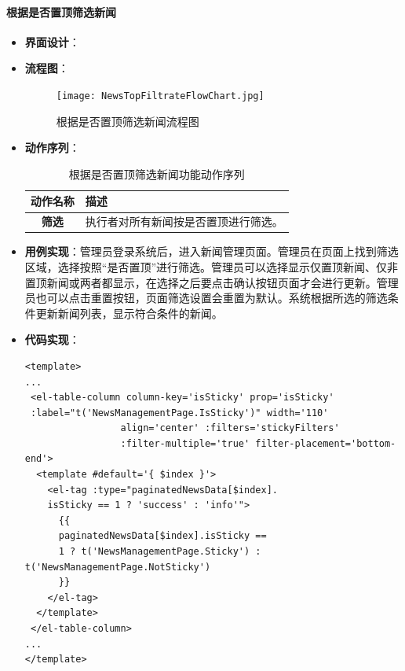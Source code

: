 \paragraph{根据是否置顶筛选新闻}
\begin{itemize}
	\item \textbf{界面设计}：
	\item \textbf{流程图}：
	\begin{figure}[H]
		\centering
		\texttt{[image: NewsTopFiltrateFlowChart.jpg]}
		\caption{根据是否置顶筛选新闻流程图}
		\label{1}
	\end{figure}
	\item \textbf{动作序列}：
	\begin{table}[H]
		\centering
		\caption{根据是否置顶筛选新闻功能动作序列}
		\renewcommand\arraystretch{1.5}
		\begin{tabular}{|c|>{\raggedright\arraybackslash}p{10cm}|}
			\hline
			\textbf{动作名称} & \textbf{描述} \\ \hline
			\textbf{筛选} & 执行者对所有新闻按是否置顶进行筛选。 \\ \hline
		\end{tabular}
	\end{table}
	\item \textbf{用例实现}：管理员登录系统后，进入新闻管理页面。管理员在页面上找到筛选区域，选择按照“是否置顶”进行筛选。管理员可以选择显示仅置顶新闻、仅非置顶新闻或两者都显示，在选择之后要点击确认按钮页面才会进行更新。管理员也可以点击重置按钮，页面筛选设置会重置为默认。系统根据所选的筛选条件更新新闻列表，显示符合条件的新闻。
	\item \textbf{代码实现}：
	\begin{verbatim}
<template>
...
 <el-table-column column-key='isSticky' prop='isSticky' 
 :label="t('NewsManagementPage.IsSticky')" width='110'
                 align='center' :filters='stickyFilters' 
                 :filter-multiple='true' filter-placement='bottom-end'>
  <template #default='{ $index }'>
    <el-tag :type="paginatedNewsData[$index].
    isSticky == 1 ? 'success' : 'info'">
      {{
	  paginatedNewsData[$index].isSticky == 
	  1 ? t('NewsManagementPage.Sticky') : t('NewsManagementPage.NotSticky')
      }}
    </el-tag>
  </template>
 </el-table-column>
...
</template>
		
	\end{verbatim}
	
\end{itemize}

